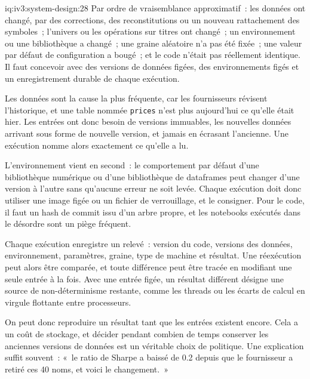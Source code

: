 \begin{solution}{iq:iv3:system-design:28}
Par ordre de vraisemblance approximatif~: les données ont changé, par des corrections, des reconstitutions ou un nouveau rattachement des symboles~; l'univers ou les opérations sur titres ont changé~; un environnement ou une bibliothèque a changé~; une graine aléatoire n'a pas été fixée~; une valeur par défaut de configuration a bougé~; et le code n'était pas réellement identique. Il faut concevoir avec des versions de données figées, des environnements figés et un enregistrement durable de chaque exécution.

Les données sont la cause la plus fréquente, car les fournisseurs révisent l'historique, et une table nommée \texttt{prices} n'est plus aujourd'hui ce qu'elle était hier. Les entrées ont donc besoin de versions immuables, les nouvelles données arrivant sous forme de nouvelle version, et jamais en écrasant l'ancienne. Une exécution nomme alors exactement ce qu'elle a lu.

L'environnement vient en second~: le comportement par défaut d'une bibliothèque numérique ou d'une bibliothèque de dataframes peut changer d'une version à l'autre sans qu'aucune erreur ne soit levée. Chaque exécution doit donc utiliser une image figée ou un fichier de verrouillage, et le consigner. Pour le code, il faut un hash de commit issu d'un arbre propre, et les notebooks exécutés dans le désordre sont un piège fréquent.

Chaque exécution enregistre un relevé~: version du code, versions des données, environnement, paramètres, graine, type de machine et résultat. Une réexécution peut alors être comparée, et toute différence peut être tracée en modifiant une seule entrée à la fois. Avec une entrée figée, un résultat différent désigne une source de non-déterminisme restante, comme les threads ou les écarts de calcul en virgule flottante entre processeurs.

On peut donc reproduire un résultat tant que les entrées existent encore. Cela a un coût de stockage, et décider pendant combien de temps conserver les anciennes versions de données est un véritable choix de politique. Une explication suffit souvent~: «~le ratio de Sharpe a baissé de 0.2 depuis que le fournisseur a retiré ces 40 noms, et voici le changement.~»

\end{solution}

